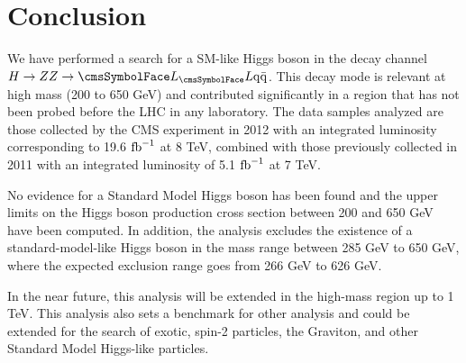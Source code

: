 %
%

\chapter{Conclusion}

We have performed a search for a SM-like Higgs boson in the decay channel $H \rightarrow ZZ \rightarrow \LL \qqbar$.  This decay mode is relevant at high mass (200 to 650 GeV) and contributed significantly in a region that has not been probed before the LHC in any laboratory. The data samples analyzed are those collected by the CMS experiment in 2012 with an integrated luminosity corresponding to 19.6 $\mbox{$\textrm{fb}^{-1}$}$ at 8 TeV, combined with those previously collected in 2011 with an integrated luminosity of 5.1 $\mbox{$\textrm{fb}^{-1}$}$ at 7 TeV.

No evidence for a Standard Model Higgs boson has been found and the upper limits on the Higgs boson production cross section between 200 and 650 GeV have been computed.  In addition, the analysis excludes the existence of a standard-model-like Higgs boson in the mass range between 285 GeV to 650 GeV, where the expected exclusion range goes from 266 GeV to 626 GeV.

In the near future, this analysis will be extended in the high-mass region up to 1 TeV.  This analysis also sets a benchmark for other analysis and could be extended for the search of exotic, spin-2 particles, the Graviton, and other Standard Model Higgs-like particles.
